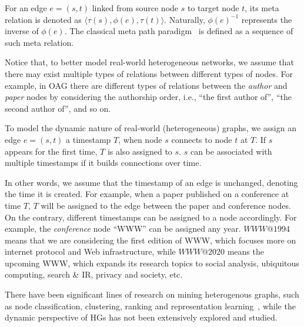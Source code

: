 \documentclass[sigconf]{acmart}
\theoremstyle{definition}
\begin{document}
For an edge $e=(s, t)$ linked from source node $s$ to target node $t$, its {meta relation} is denoted as $\langle \tau(s), \phi(e), \tau(t) \rangle$. Naturally, $\phi(e)^{-1}$ represents the inverse of $\phi(e)$. The classical meta path paradigm~\cite{Sun:VLDB11,DBLP:conf/kdd/SunNHYYY12, Sun:BOOK2012} is defined as a sequence of such meta relation.

Notice that, to better model real-world heterogeneous networks, we assume that there may exist multiple types of relations between different types of nodes. 
For example, in OAG there are different types of relations between the \textit{author} and \textit{paper} nodes by considering the authorship order, i.e., ``the first author of'', ``the second author of'', and so on.


To model the dynamic nature of real-world (heterogeneous) graphs, we assign an edge $e=(s, t)$  a timestamp $T$, when node $s$ connects to node $t$ at $T$. 
If $s$ appears for the first time, $T$ is also assigned to $s$. 
$s$ can be associated with multiple timestamps if it builds connections over time. 

In other words, we assume that the timestamp of an edge is unchanged, denoting the time it is created. For example, when a paper published on a conference at time $T$, $T$ will be assigned to the edge between the paper and conference nodes. 
On the contrary, different timestamps can be assigned to a node accordingly. 
For example, the \textit{conference} node ``WWW'' can be assigned any year. $WWW@1994$ means that we are considering the first edition of WWW, which focuses more on internet protocol and Web infrastructure, while $WWW@2020$ means the upcoming WWW, which expands its research topics to social analysis, ubiquitous computing, search \& IR, privacy and society, etc. 

There have been significant lines of research on mining heterogenous graphs, such as node classification, clustering, ranking and representation learning~\cite{Sun:BOOK2012,Sun:VLDB11,DBLP:conf/kdd/SunNHYYY12,dong2017metapath2vec}, while the dynamic perspective of HGs has not been extensively explored and studied. 
\end{document}
